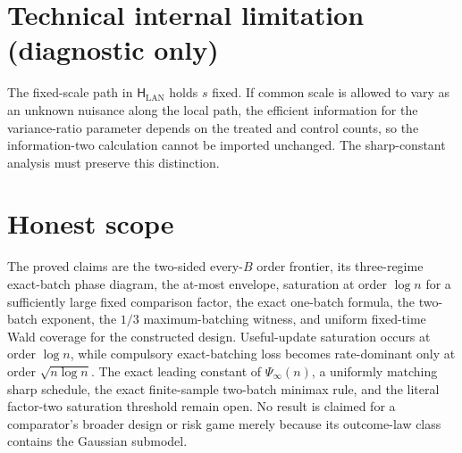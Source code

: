 \documentclass{article}
\begin{document}
\section*{Technical internal limitation (diagnostic only)}

The fixed-scale path in \(\mathsf H_{\mathrm{LAN}}\) holds \(s\) fixed. If common scale is allowed to vary as an unknown nuisance along the local path, the efficient information for the variance-ratio parameter depends on the treated and control counts, so the information-two calculation cannot be imported unchanged. The sharp-constant analysis must preserve this distinction.

\section{Honest scope}

The proved claims are the two-sided every-\(B\) order frontier, its three-regime exact-batch phase diagram, the at-most envelope, saturation at order \(\log n\) for a sufficiently large fixed comparison factor, the exact one-batch formula, the two-batch exponent, the \(1/3\) maximum-batching witness, and uniform fixed-time Wald coverage for the constructed design. Useful-update saturation occurs at order \(\log n\), while compulsory exact-batching loss becomes rate-dominant only at order \(\sqrt{n\log n}\). The exact leading constant of \(\Psi_\infty(n)\), a uniformly matching sharp schedule, the exact finite-sample two-batch minimax rule, and the literal factor-two saturation threshold remain open. No result is claimed for a comparator's broader design or risk game merely because its outcome-law class contains the Gaussian submodel.
\end{document}
